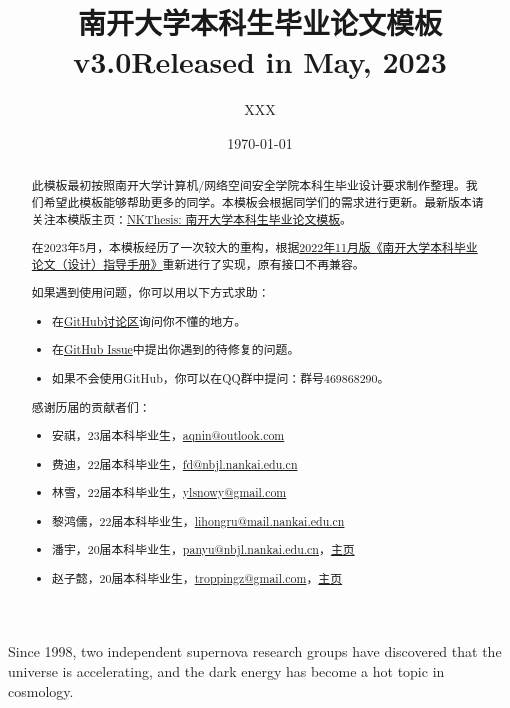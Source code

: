\documentclass{nkuthesis}
\title{南开大学本科生毕业论文模板\\ v3.0}
\title*{Released in May, 2023}
\author{XXX}
\date{\today}
\begin{document}

\maketitle
\begin{titlepage}
  \declaration
\end{titlepage}

\begin{abstract}
此模板最初按照南开大学计算机/网络空间安全学院本科生毕业设计要求制作整理。我们希望此模板能够帮助更多的同学。本模板会根据同学们的需求进行更新。最新版本请关注本模版主页：\href{https://tr0py.github.io/NKU-thesis-template-2020/}{NKThesis: 南开大学本科生毕业论文模板}。

在2023年5月，本模板经历了一次较大的重构，根据\href{http://jwc.nankai.edu.cn/2022/1124/c24a497818/page.htm}{2022年11月版《南开大学本科毕业论文（设计）指导手册》}重新进行了实现，原有接口不再兼容。
  
如果遇到使用问题，你可以用以下方式求助：
\begin{itemize}
  \item 在\href{https://github.com/Tr0py/NKU-thesis-template-2020/discussions}{GitHub讨论区}询问你不懂的地方。
  \item 在\href{https://github.com/Tr0py/NKU-thesis-template-2020/issues}{GitHub Issue}中提出你遇到的待修复的问题。
  \item 如果不会使用GitHub，你可以在QQ群中提问：群号469868290。
\end{itemize}

感谢历届的贡献者们：
\begin{itemize}
    \item 安祺，23届本科毕业生，\url{aqnin@outlook.com}
    \item 费迪，22届本科毕业生，\url{fd@nbjl.nankai.edu.cn}
    \item 林雪，22届本科毕业生，\url{ylsnowy@gmail.com}
    \item 黎鸿儒，22届本科毕业生，\url{lihongru@mail.nankai.edu.cn}
    \item 潘宇，20届本科毕业生，\url{panyu@nbjl.nankai.edu.cn}，\href{https://nbjl.nankai.edu.cn/2019/0513/c19244a264683/page.htm}{主页}
    \item 赵子懿，20届本科毕业生，\url{troppingz@gmail.com}，\href{https://tr0py.github.io/}{主页}
\end{itemize}
\end{abstract}
  
\begin{abstract*}
Since 1998, two independent supernova research groups have discovered that the universe is accelerating, and the dark energy has become a hot topic in cosmology. 
\end{abstract*}
\end{document}
